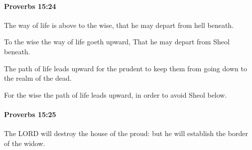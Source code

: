 		\paragraph{Proverbs 15:24} %
			\label{PROVERBS-15-24}

			The way of life is above to the wise, that he may depart from hell beneath.

			\begin{versebox}
					\item[BHS] 
					\item[ASV] To the wise the way of life goeth upward, That he may depart from Sheol beneath.
					\item[NIV] The path of life leads upward for the prudent to keep them from going down to the realm of the dead.
					\item[NRSV] For the wise the path of life leads upward, in order to avoid Sheol below.
			\end{versebox}

		\paragraph{Proverbs 15:25} %
			\label{PROVERBS-15-25}

			The LORD will destroy the house of the proud: but he will establish the border of the widow.

